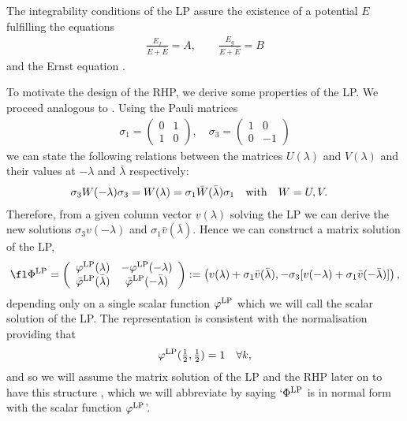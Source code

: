\documentclass[12pt]{iopart}
\begin{document}
The integrability conditions of the LP  assure the existence of a potential $E$ fulfilling the equations
\begin{eqnarray}
\frac{E_f}{E+\bar{E}}=A, \quad\quad
\frac{E_g}{E+\bar{E}}=B \label{ABdurchE}
\end{eqnarray}
and the Ernst equation .

To motivate the design of the RHP, we derive some properties of the LP. We proceed analogous to \cite{Neugebauer_Meinel2003}. %
Using the Pauli matrices
\begin{eqnarray}
\sigma_1=\left(\begin{array}{cc} 0 & 1 \\ 1 & 0 \end{array}\right), \quad
\sigma_3=\left(\begin{array}{cc} 1 & 0 \\ 0 & -1 \end{array}\right)
\end{eqnarray}
we can state the following relations between the matrices  $U(\lambda)$ and $V(\lambda)$ and their values at $-\lambda$ and $\bar{\lambda}$ respectively:
\begin{eqnarray} 
\sigma_3 W(-\lambda) \sigma_3=W(\lambda)=\sigma_1 \bar{W}(\bar{\lambda}) \sigma_1
\quad {\rm with}\quad &W=U,V. 
\end{eqnarray}
Therefore, from a given column vector $v(\lambda)$ solving the LP we can derive the new solutions $\sigma_3 v(-\lambda)$ and $\sigma_1 \bar{v}(\bar{\lambda})$.  Hence we can construct a matrix solution of the LP, 
\begin{eqnarray} 
\fl \Phi^{\rm LP}=\left(\begin{array}{cc} \varphi^{\rm LP}(\lambda) & -\varphi^{\rm LP}(-\lambda) \\ \bar{\varphi}^{\rm LP}(\bar{\lambda}) & \bar{\varphi}^{\rm LP}(-\bar{\lambda}) \end{array}\right):=\left(v(\lambda)+\sigma_1 \bar{v}(\bar{\lambda}),-\sigma_3 [v(-\lambda)+\sigma_1 \bar{v}(-\bar{\lambda})]\right),
\label{Matrixlösung}
\end{eqnarray}
depending only on a single scalar function $\varphi^{\rm LP}$ which we will call the scalar solution of the LP. The representation  is consistent with the normalisation  providing that 
\begin{equation}
\varphi^{\rm LP}(\mbox{$\frac12$},\mbox{$\frac12$})=1\quad\forall k, \label{NormChi}
\end{equation}
and so we will assume the matrix solution of the LP and the RHP later on to have this structure , which we will abbreviate by saying `$\Phi^{\rm LP}$ is in normal form with the scalar function $\varphi^{\rm LP}$'. 
\end{document}
